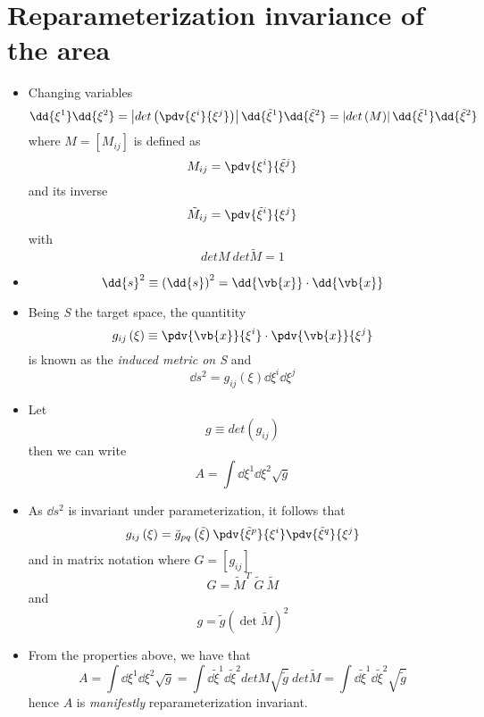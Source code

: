 \documentclass[12pt]{report}
\begin{document}
\section{Reparameterization invariance of the area}
\begin{itemize}
    \item Changing variables
    $$\dd{\xi^1}\dd{\xi^2} = \left| det\left(\pdv{\xi^i}{\xi^j} \right) \right|\dd{\tilde{\xi}^1}\dd{\tilde{\xi}^2} = \left| det\left(M \right) \right|\dd{\tilde{\xi}^1}\dd{\tilde{\xi}^2}$$
    where $M = [M_{ij}]$ is defined as 
    $$M_{ij} = \pdv{\xi^i}{\tilde{\xi}^j}$$
    and its inverse
    $$\tilde{M}_{ij} = \pdv{\tilde{\xi}^i}{\xi^j}$$
    with
    $$detM\ det\tilde{M} = 1$$
    \item $$\dd{s}^2 \equiv \left(\dd{s} \right)^2 = \dd{\vb{x}}\cdot\dd{\vb{x}}$$
    \item Being \textit{S} the target space, the quantitity
    $$g_{ij}\left(\xi \right) \equiv \pdv{\vb{x}}{\xi^i}\cdot\pdv{\vb{x}}{\xi^j}$$
    is known as the \textit{induced metric on S} and
    $$\dd{s}^2 = g_{ij}\left(\xi \right)\dd{\xi^i}\dd{\xi^j}$$
    \item Let
    $$g\equiv det\left(g_{ij} \right)$$
    then we can write
    $$A = \int \dd{\xi^1}\dd{\xi^2}\sqrt{g}$$
    \item As $\dd{s}^2$ is invariant under parameterization, it follows that
    $$g_{ij}\left(\xi \right) = \tilde{g}_{pq}\left(\tilde{\xi} \right)\pdv{\tilde{\xi}^p}{\xi^i}\pdv{\tilde{\xi}^q}{\xi^j}$$
    and in matrix notation where $G = \left[g_{ij}\right]$
    $$G = \tilde{M}^T\ \tilde{G}\ \tilde{M}$$
    and
    $$g = \tilde{g}\left(\det \tilde{M} \right)^2$$
    \item From the properties above, we have that
    $$A = \int \dd{\xi^1}\dd{\xi^2}\sqrt{g} = \int \dd{\tilde{\xi}^1}\dd{\tilde{\xi}^2}detM \sqrt{\tilde{g}}\ det\tilde{M} = \int \dd{\tilde{\xi}^1}\dd{\tilde{\xi}^2}\sqrt{\tilde{g}}$$
    hence $A$ is \textit{manifestly} reparameterization invariant.
\end{itemize}
\end{document}

